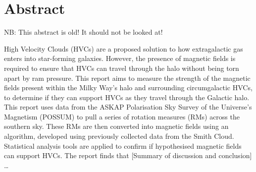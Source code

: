 \chapter*{Abstract}
\vspace{-1em}

NB: This abstract is old! It should not be looked at!

High Velocity Clouds (HVCs) are a proposed solution to how extragalactic gas enters into star-forming galaxies. However, the presence of magnetic fields is required to ensure that HVCs can travel through the halo without being torn apart by ram pressure. This report aims to measure the strength of the magnetic fields present within the Milky Way’s halo and surrounding circumgalactic HVCs, to determine if they can support HVCs as they travel through the Galactic halo. This report uses data from the ASKAP Polarisation Sky Survey of the Universe’s Magnetism (POSSUM) to pull a series of rotation measures (RMs) across the southern sky. These RMs are then converted into magnetic fields using an algorithm, developed using previously collected data from the Smith Cloud. Statistical analysis tools are applied to confirm if hypothesised magnetic fields can support HVCs. The report finds that [Summary of discussion and conclusion] …

